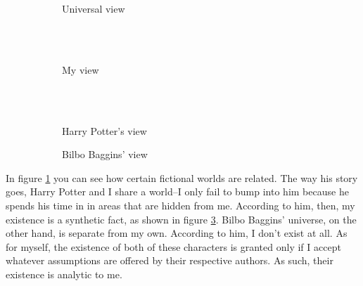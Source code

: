 \documentclass[12pt]{article}
\begin{document}
\begin{flushleft}
\begin{figure}[h]
\begin{subfigure}{.25\linewidth}
{{            }
        }
        \caption{Universal view}
        \label{universe}
    \end{subfigure}%
    \begin{subfigure}{.25\linewidth}
        \centering
            \hspace*{3em}%
            \fitchprf
            {
                \pline{\mathnormal{\theta}}
            }
            {
                \pline{\bigstar} \\
                \subproof
                {
                    \pline{\mathnormal{\eta}}
                }
                {
                } \\
                \subproof
                {
                    \pline{\mathnormal{\beta}}
                }
                {
                }
            }
        \caption{My view}
        \label{me}
     \end{subfigure}%
    \begin{subfigure}{.25\linewidth}
        \centering
        \hspace*{3em}%
        \fitchprf
        {
            \pline{\mathnormal{\theta}} \\
            \pline{\mathnormal{\eta}} \\
        }
        {
            \pline{\bigstar}
        }
        \caption{Harry Potter's view}
        \label{harry}
     \end{subfigure}%
     \begin{subfigure}{.25\linewidth}
        \centering
        \hspace*{3em}%
        \fitchprf
        {
            \pline{\mathnormal{\zeta}}
        }
        {
            \pline{\bigstar}
        }
        \caption{Bilbo Baggins' view}
        \label{bilbo}
    \end{subfigure}
    \caption{}
    \label{fiction}
\end{figure}

In figure \ref{universe} you can see how certain fictional worlds are related.
The way his story goes, Harry Potter and I share a world--I only fail to bump into him because he spends his time in in areas that are hidden from me.
According to him, then, my existence is a synthetic fact, as shown in figure \ref{harry}.
Bilbo Baggins' universe, on the other hand, is separate from my own.
According to him, I don't exist at all.
As for myself, the existence of both of these characters is granted only if I accept whatever assumptions are offered by their respective authors.
As such, their existence is analytic to me.


\end{flushleft}
\end{document}
